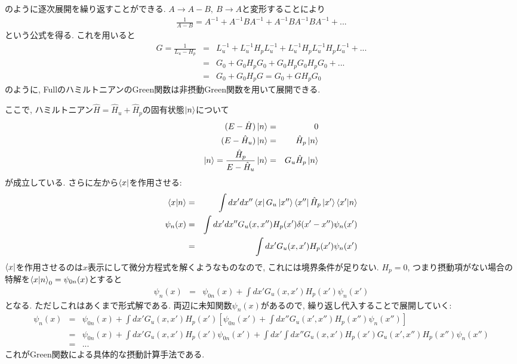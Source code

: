\documentclass[10.5pt,a4paper]{jreport}
\begin{document}
のように逐次展開を繰り返すことができる. $A \rightarrow A - B,\ B \rightarrow A$と変形することにより
\begin{eqnarray}
  \frac{1}{A-B} = A^{-1} + A^{-1}BA^{-1} + A^{-1}BA^{-1}BA^{-1} + ...
\end{eqnarray}
という公式を得る. これを用いると
\begin{eqnarray}
  G = \frac{1}{L_u - H_p} &=& L_u^{-1} + L_u^{-1}H_pL_u^{-1} + L_u^{-1}H_pL_u^{-1}H_pL_u^{-1} + ...\\
  &=& G_0 + G_0H_pG_0 + G_0H_pG_0H_pG_0 + ...\\
  &=& G_0 + G_0H_pG = G_0 + GH_pG_0
\end{eqnarray}
のように, FullのハミルトニアンのGreen関数は非摂動Green関数を用いて展開できる.

ここで, ハミルトニアン$\hat{H} = \hat{H}_u+\hat{H}_p$の固有状態$\ket{n}$について
\begin{eqnarray}
  (E-\hat{H})\ket{n} &=& 0\\
  (E-\hat{H}_u)\ket{n} &=& \hat{H}_p\ket{n}\\
  \ket{n} = \frac{\hat{H}_p}{E-\hat{H}_u}\ket{n} &=& G_u\hat{H}_p\ket{n}
\end{eqnarray}
が成立している. さらに左から$\bra{x}$を作用させる:
\begin{eqnarray}
  \expval{x|n} &=& \int dx'dx''\bra{x}G_u\ket{x''}\bra{x''}\hat{H}_p\ket{x'}\expval{x'|n}\\
  \psi_n(x) &=& \int dx'dx''G_u(x, x'')H_p(x')\delta(x'-x'')\psi_n(x')\\
  &=& \int dx'G_u(x, x')H_p(x')\psi_n(x')
\end{eqnarray}
$\bra{x}$を作用させるのは$x$表示にして微分方程式を解くようなものなので, これには境界条件が足りない. $H_p = 0$, つまり摂動項がない場合の特解を$\expval{x|n}_0 = \psi_{0n}(x)$とすると
\begin{eqnarray}
  \psi_n(x) &=& \psi_{0n}(x) + \int dx'G_u(x, x')H_p(x')\psi_n(x')
\end{eqnarray}
となる. ただしこれはあくまで形式解である. 両辺に未知関数$\psi_n(x)$があるので, 繰り返し代入することで展開していく:
\begin{eqnarray}
  \nonumber    \psi_n(x) &=& \psi_{0n}(x) + \int dx'G_u(x, x')H_p(x')\left[\psi_{0n}(x') + \int dx''G_u(x', x'')H_p(x'')\psi_n(x'')\right]\\
  \nonumber     &=& \psi_{0n}(x) + \int dx'G_u(x, x')H_p(x')\psi_{0n}(x') + \int dx'\int dx''G_u(x, x')H_p(x')G_u(x', x'')H_p(x'')\psi_n(x'')\\
  &=&...
\end{eqnarray}
これがGreen関数による具体的な摂動計算手法である. 
\end{document}
